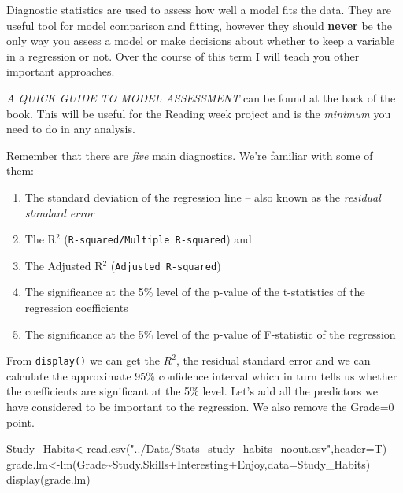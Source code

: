 \documentclass[
]{gitbook}
\newenvironment{Shaded}{\begin{snugshade}}{\end{snugshade}}
\newcommand{\AttributeTok}[1]{\textcolor[rgb]{0.77,0.63,0.00}{#1}}
\newcommand{\FunctionTok}[1]{\textcolor[rgb]{0.00,0.00,0.00}{#1}}
\newcommand{\NormalTok}[1]{#1}
\newcommand{\OtherTok}[1]{\textcolor[rgb]{0.56,0.35,0.01}{#1}}
\newcommand{\SpecialCharTok}[1]{\textcolor[rgb]{0.00,0.00,0.00}{#1}}
\newcommand{\StringTok}[1]{\textcolor[rgb]{0.31,0.60,0.02}{#1}}
\providecommand{\tightlist}{%
  \setlength{\itemsep}{0pt}\setlength{\parskip}{0pt}}
\begin{document}
Diagnostic statistics are used to assess how well a model fits the data. They are useful tool for model comparison and fitting, however they should \textbf{never} be the only way you assess a model or make decisions about whether to keep a variable in a regression or not. Over the course of this term I will teach you other important approaches.

\emph{A QUICK GUIDE TO MODEL ASSESSMENT} can be found at the back of the book. This will be useful for the Reading week project and is the \emph{minimum} you need to do in any analysis.

Remember that there are \emph{five} main diagnostics. We're familiar with some of them:

\begin{enumerate}
\def\labelenumi{\arabic{enumi}.}
\tightlist
\item
  The standard deviation of the regression line -- also known as the \emph{residual standard error}
\item
  The R\(^2\) (\texttt{R-squared/Multiple\ R-squared}) and
\item
  The Adjusted R\(^2\) (\texttt{Adjusted\ R-squared})
\item
  The significance at the 5\% level of the p-value of the t-statistics of the regression coefficients
\item
  The significance at the 5\% level of the p-value of F-statistic of the regression
\end{enumerate}

From \texttt{display()} we can get the \(R^2\), the residual standard error and we can calculate the approximate 95\% confidence interval which in turn tells us whether the coefficients are significant at the 5\% level. Let's add all the predictors we have considered to be important to the regression. We also remove the Grade=0 point.

\begin{Shaded}
\begin{Highlighting}[]
\NormalTok{Study\_Habits}\OtherTok{\textless{}{-}}\FunctionTok{read.csv}\NormalTok{(}\StringTok{"../Data/Stats\_study\_habits\_noout.csv"}\NormalTok{,}\AttributeTok{header=}\NormalTok{T)}
\NormalTok{grade.lm}\OtherTok{\textless{}{-}}\FunctionTok{lm}\NormalTok{(Grade}\SpecialCharTok{\textasciitilde{}}\NormalTok{Study.Skills}\SpecialCharTok{+}\NormalTok{Interesting}\SpecialCharTok{+}\NormalTok{Enjoy,}\AttributeTok{data=}\NormalTok{Study\_Habits)}
\FunctionTok{display}\NormalTok{(grade.lm)}
\end{Highlighting}
\end{Shaded}
\end{document}
